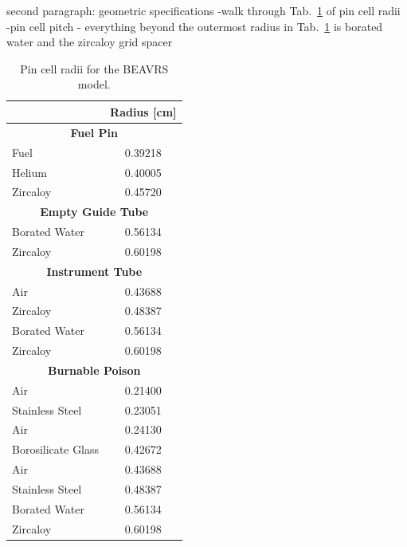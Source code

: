 second paragraph: geometric specifications
-walk through Tab.~\ref{table:chap7-pin-cell-radii} of pin cell radii
-pin cell pitch - everything beyond the outermost radius in Tab.~\ref{table:chap7-pin-cell-radii} is borated water and the zircaloy grid spacer

\begin{table}[h!]
  \centering
  \caption[BEAVRS pin cell radii]{Pin cell radii for the \ac{BEAVRS} model.}
  \small
  \label{table:chap7-pin-cell-radii} 
  \vspace{6pt}
  \begin{tabular}{l c}
  \toprule
  \rowcolor{lightgray}
  \multicolumn{1}{c}{\bf Material} &
  \multicolumn{1}{c}{\bf Radius [cm]} \\
  \midrule
  \multicolumn{2}{c}{\bf Fuel Pin} \\
  \midrule
  Fuel &  0.39218 \\
  Helium & 0.40005 \\
  Zircaloy & 0.45720 \\
  \midrule
  \multicolumn{2}{c}{\bf Empty Guide Tube\footnotemark} \\
  \midrule
  Borated Water & 0.56134 \\
  Zircaloy & 0.60198 \\
  \midrule
  \multicolumn{2}{c}{\bf Instrument Tube} \\
  \midrule
  Air & 0.43688 \\
  Zircaloy & 0.48387 \\
  Borated Water & 0.56134 \\
  Zircaloy & 0.60198 \\
  \midrule
  \multicolumn{2}{c}{\bf Burnable Poison\footnotemark} \\
  \midrule
  Air & 0.21400 \\
  Stainless Steel & 0.23051 \\
  Air & 0.24130 \\
  Borosilicate Glass & 0.42672 \\
  Air & 0.43688 \\
  Stainless Steel & 0.48387 \\
  Borated Water & 0.56134 \\
  Zircaloy & 0.60198 \\
  \bottomrule
\end{tabular}
\end{table}

\addtocounter{footnote}{-2}


